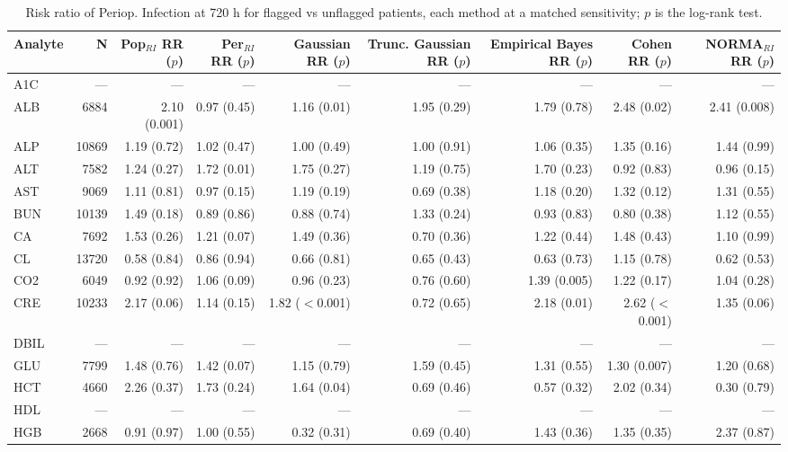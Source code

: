 \begin{table}[ht]
\centering
\footnotesize
\caption{Risk ratio of Periop. Infection at 720 h for flagged vs unflagged patients, each method at a matched sensitivity; $p$ is the log-rank test.}
\begin{tabular}{lrrrrrrrr}
\toprule
Analyte & N & Pop$_{RI}$ RR ($p$) & Per$_{RI}$ RR ($p$) & Gaussian RR ($p$) & Trunc. Gaussian RR ($p$) & Empirical Bayes RR ($p$) & Cohen RR ($p$) & NORMA$_{RI}$ RR ($p$) \\
\midrule
A1C & --- & --- & --- & --- & --- & --- & --- & --- \\
ALB & 6884 & 2.10 (0.001) & 0.97 (0.45) & 1.16 (0.01) & 1.95 (0.29) & 1.79 (0.78) & 2.48 (0.02) & 2.41 (0.008) \\
ALP & 10869 & 1.19 (0.72) & 1.02 (0.47) & 1.00 (0.49) & 1.00 (0.91) & 1.06 (0.35) & 1.35 (0.16) & 1.44 (0.99) \\
ALT & 7582 & 1.24 (0.27) & 1.72 (0.01) & 1.75 (0.27) & 1.19 (0.75) & 1.70 (0.23) & 0.92 (0.83) & 0.96 (0.15) \\
AST & 9069 & 1.11 (0.81) & 0.97 (0.15) & 1.19 (0.19) & 0.69 (0.38) & 1.18 (0.20) & 1.32 (0.12) & 1.31 (0.55) \\
BUN & 10139 & 1.49 (0.18) & 0.89 (0.86) & 0.88 (0.74) & 1.33 (0.24) & 0.93 (0.83) & 0.80 (0.38) & 1.12 (0.55) \\
CA & 7692 & 1.53 (0.26) & 1.21 (0.07) & 1.49 (0.36) & 0.70 (0.36) & 1.22 (0.44) & 1.48 (0.43) & 1.10 (0.99) \\
CL & 13720 & 0.58 (0.84) & 0.86 (0.94) & 0.66 (0.81) & 0.65 (0.43) & 0.63 (0.73) & 1.15 (0.78) & 0.62 (0.53) \\
CO2 & 6049 & 0.92 (0.92) & 1.06 (0.09) & 0.96 (0.23) & 0.76 (0.60) & 1.39 (0.005) & 1.22 (0.17) & 1.04 (0.28) \\
CRE & 10233 & 2.17 (0.06) & 1.14 (0.15) & 1.82 ($<$0.001) & 0.72 (0.65) & 2.18 (0.01) & 2.62 ($<$0.001) & 1.35 (0.06) \\
DBIL & --- & --- & --- & --- & --- & --- & --- & --- \\
GLU & 7799 & 1.48 (0.76) & 1.42 (0.07) & 1.15 (0.79) & 1.59 (0.45) & 1.31 (0.55) & 1.30 (0.007) & 1.20 (0.68) \\
HCT & 4660 & 2.26 (0.37) & 1.73 (0.24) & 1.64 (0.04) & 0.69 (0.46) & 0.57 (0.32) & 2.02 (0.34) & 0.30 (0.79) \\
HDL & --- & --- & --- & --- & --- & --- & --- & --- \\
HGB & 2668 & 0.91 (0.97) & 1.00 (0.55) & 0.32 (0.31) & 0.69 (0.40) & 1.43 (0.36) & 1.35 (0.35) & 2.37 (0.87) \\

\end{tabular}
\end{table}
